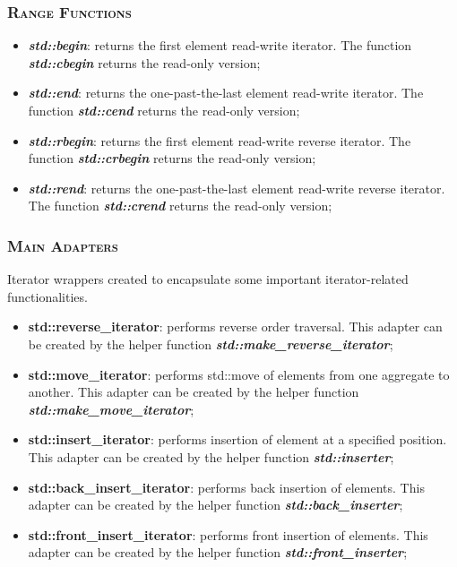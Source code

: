 \documentclass[10pt]{article}
\begin{document}
\begin{multicols*}{5}
{\subsubsection*{\textsc{Range Functions}} 
\begin{itemize}[leftmargin=*,topsep=0.25pt]
  \setlength\itemsep{.3pt}
	\item  \emph{\textbf{std::begin}}: returns the first element read-write iterator. The function \emph{\textbf{std::cbegin}} returns the read-only version;
	\item  \emph{\textbf{std::end}}: returns the one-past-the-last element read-write iterator. The function \emph{\textbf{std::cend}} returns the read-only version;
	\item  \emph{\textbf{std::rbegin}}: returns the first element read-write reverse iterator. The function \emph{\textbf{std::crbegin}} returns the read-only version;
	\item  \emph{\textbf{std::rend}}: returns the one-past-the-last element read-write reverse iterator. The function \emph{\textbf{std::crend}} returns the read-only version;
\end{itemize}

\subsubsection*{\textsc{Main Adapters}} 
Iterator wrappers created to encapsulate some important iterator-related functionalities. 
\begin{itemize}[leftmargin=*,topsep=0.25pt]
  \setlength\itemsep{.3pt}
	\item \textbf{std::reverse\_iterator}: performs reverse order traversal. This adapter can be created by the helper function \emph{\textbf{std::make\_reverse\_iterator}};
	\item \textbf{std::move\_iterator}: performs std::move of elements from one aggregate to another. This adapter can be created by the helper function \emph{\textbf{std::make\_move\_iterator}};
	\item \textbf{std::insert\_iterator}: performs insertion of element at a specified position. This adapter can be created by the helper function \emph{\textbf{std::inserter}};
	\item \textbf{std::back\_insert\_iterator}: performs back insertion of elements. This adapter can be created by the helper function \emph{\textbf{std::back\_inserter}};
	\item \textbf{std::front\_insert\_iterator}: performs front insertion of elements. This adapter can be created by the helper function \emph{\textbf{std::front\_inserter}};
\end{itemize}


}
\end{multicols*}
\end{document}
